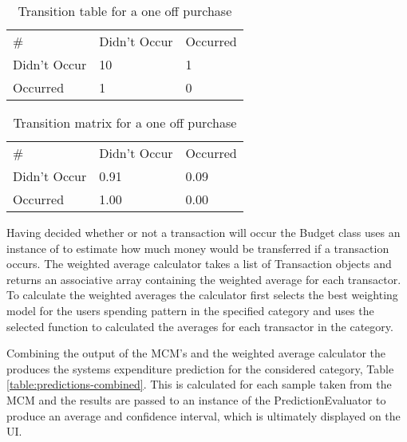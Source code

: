 \begin{table}[!htb]
  \centering
    \begin{tabular}{lll}
    \#           & Didn't Occur & Occurred \\
    Didn't Occur & 10           & 1       \\
    Occurred     & 1            & 0      
    \end{tabular}
    \caption{Transition table for a one off purchase}
    \label{table:transition-table} 
\end{table}

\begin{table}[!htb]
  \centering
    \begin{tabular}{lll}
    \#           & Didn't Occur & Occurred \\
    Didn't Occur & 0.91         & 0.09       \\
    Occurred     & 1.00         & 0.00     
    \end{tabular}
    \caption{Transition matrix for a one off purchase}
    \label{table:transition-matrix}
   
\end{table}

Having decided whether or not a transaction will occur the Budget class uses an instance of  to estimate how much money would be transferred if a transaction occurs. The weighted average calculator takes a list of Transaction objects and returns an associative array containing the weighted average for each transactor. To calculate the weighted averages the calculator first selects the best weighting model for the users spending pattern in the specified category and uses the selected function to calculated the averages for each transactor in the category.

Combining the output of the MCM's and the weighted average calculator the produces the systems expenditure prediction for the considered category, Table \ref{table:predictions-combined}. This is calculated for each sample taken from the MCM and the results are passed to an instance of the PredictionEvaluator to produce an average and confidence interval, which is ultimately displayed on the UI.

